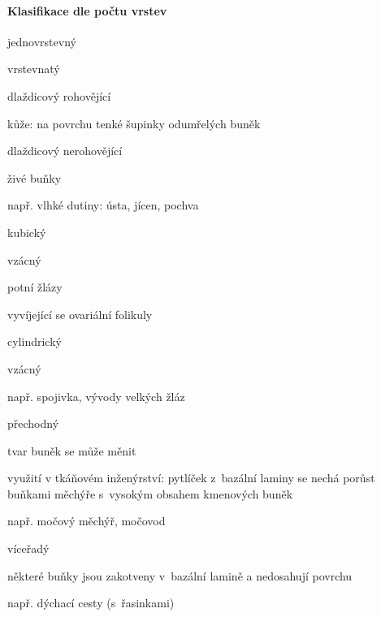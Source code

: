 \documentclass[DIV=8]{scrreprt}
\begin{document}
\paragraph{Klasifikace dle počtu vrstev}
\begin{myItemize}[nosep]
    \item jednovrstevný
    \item vrstevnatý
\begin{myItemize}[nosep]
    \item dlaždicový rohovějící
\begin{myItemize}[nosep]
    \item kůže: na povrchu tenké šupinky odumřelých buněk
\end{myItemize}

    \item dlaždicový nerohovějící
\begin{myItemize}[nosep]
    \item živé buňky
    \item např. vlhké dutiny: ústa, jícen, pochva
\end{myItemize}

    \item kubický
\begin{myItemize}[nosep]
    \item vzácný
    \item potní žlázy
    \item vyvíjející se ovariální folikuly
\end{myItemize}

    \item cylindrický
\begin{myItemize}[nosep]
    \item vzácný
    \item např. spojivka, vývody velkých žláz
\end{myItemize}

    \item přechodný
\begin{myItemize}[nosep]
    \item tvar buněk se může měnit
    \item využití v tkáňovém inženýrství: pytlíček z bazální laminy se nechá porůst buňkami měchýře s vysokým obsahem kmenových buněk
    \item např. močový měchýř, močovod
\end{myItemize}

    \item víceřadý
\begin{myItemize}[nosep]
    \item některé buňky jsou zakotveny v bazální lamině a nedosahují povrchu
    \item např. dýchací cesty (s řasinkami)
\end{myItemize}


\end{myItemize}
\end{myItemize}
\end{document}
